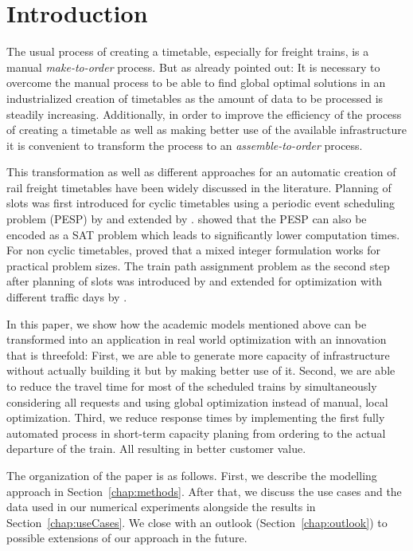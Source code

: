 \section{Introduction}
\label{chap:intro}
%
The usual process of creating a timetable, especially for freight trains, is a manual \emph{make-to-order} process. But as \cite{FP:2014} already pointed out: It is necessary to overcome the manual process to be able to find global optimal solutions in an industrialized creation of timetables as the amount of data to be processed is steadily increasing. Additionally, in order to improve the efficiency of the process of creating a timetable as well as making better use of the available infrastructure it is convenient to transform the process to an \emph{assemble-to-order} process.

This transformation as well as different approaches for an automatic creation of rail freight timetables have been widely discussed in the literature. Planning of slots was first introduced for cyclic timetables using a periodic event scheduling problem (PESP) by \cite{N:1998} and extended by \cite{O:2009}. \cite{G:2012} showed that the PESP can also be encoded as a SAT problem which leads to significantly lower computation times. For non cyclic timetables, \cite{G:2013} proved that a mixed integer formulation works for practical problem sizes. The train path assignment problem as the second step after planning of slots was introduced by \cite{NO:2014} and extended for optimization with different traffic days by \cite{N:2015}.

In this paper, we show how the academic models mentioned above can be transformed into an application in real world optimization with an innovation that is threefold: First, we are able to generate more capacity of infrastructure without actually building it but by making better use of it. Second, we are able to reduce the travel time for most of the scheduled trains by simultaneously considering all requests and using global optimization instead of manual, local optimization. Third, we reduce response times by implementing the first fully automated process in short-term capacity planing from ordering to the actual departure of the train. All resulting in better customer value.

The organization of the paper is as follows. First, we describe the modelling approach in Section~\ref{chap:methods}. After that, we discuss the use cases and the data used in our numerical experiments alongside the results in Section~\ref{chap:useCases}. We close with an outlook (Section~\ref{chap:outlook}) to possible extensions of our approach in the future.